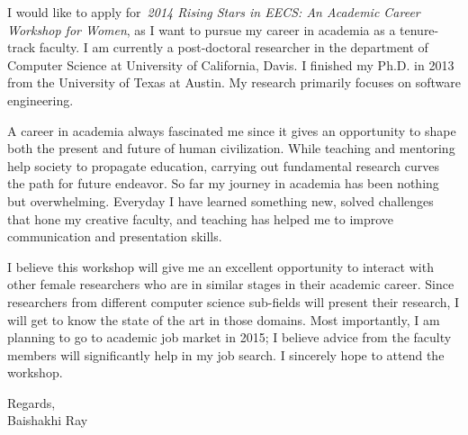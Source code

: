 \documentclass[10pt,stdletter,dateno,sigleft]{newlfm} %
\begin{document}
\begin{newlfm}

I would like to apply for~\textit{2014 Rising Stars in EECS: An Academic Career Workshop for Women}, as I want to pursue my career in academia as a tenure-track faculty. I am currently a post-doctoral researcher in the department of Computer Science at University of California, Davis. I finished my Ph.D. in 2013 from the University of Texas at Austin. My research primarily focuses on software engineering.
	
A career in academia always fascinated me since it gives an opportunity to shape both the present and future of human civilization. While teaching and mentoring help society to propagate education, carrying out fundamental research curves the path for future endeavor. So far my journey in academia 
has been nothing but overwhelming.  Everyday I have learned something new, solved challenges that hone my creative faculty, and teaching has helped me to improve communication and presentation skills.

I believe this workshop will give me an excellent opportunity to interact with other female researchers who are in similar stages in their academic career. Since researchers from different computer science sub-fields will present their research, I will get to know the state of the art in those domains. Most importantly, I am planning to go to academic job market in 2015; I believe advice from the faculty members will significantly help in my job search.
I sincerely hope to attend the workshop.

Regards, \\
Baishakhi Ray
\end{newlfm}
\end{document}
